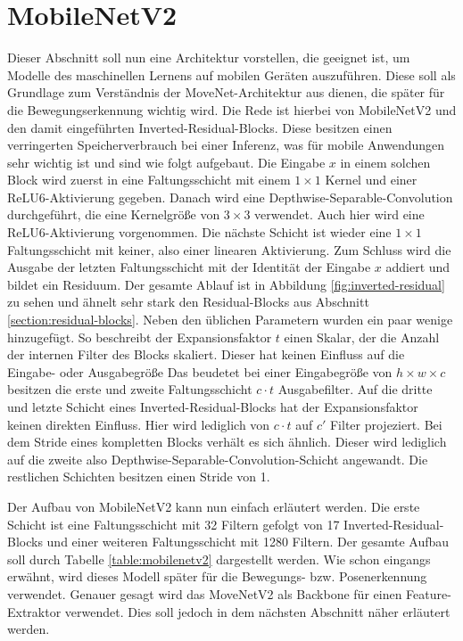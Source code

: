 \section{MobileNetV2}
Dieser Abschnitt soll nun eine Architektur vorstellen, die geeignet ist, um
Modelle des maschinellen Lernens auf mobilen Geräten auszuführen. Diese soll als
Grundlage zum Verständnis der MoveNet-Architektur aus \cite{movenet} dienen, die
später für die Bewegungserkennung wichtig wird. Die Rede ist hierbei von
MobileNetV2 \cite{sandler2019mobilenetv2} und den damit eingeführten
Inverted-Residual-Blocks. Diese besitzen einen verringerten Speicherverbrauch
bei einer Inferenz, was für mobile Anwendungen sehr wichtig ist und sind wie
folgt aufgebaut. Die Eingabe $x$ in einem solchen Block wird zuerst in eine
Faltungsschicht mit einem $1 \times 1$ Kernel und einer ReLU6-Aktivierung
gegeben. Danach wird eine Depthwise-Separable-Convolution
\cite{howard2017mobilenets} durchgeführt, die eine Kernelgröße von $3 \times 3$
verwendet. Auch hier wird eine ReLU6-Aktivierung vorgenommen. Die nächste
Schicht ist wieder eine $1 \times 1$ Faltungsschicht mit keiner, also einer
linearen Aktivierung. Zum Schluss wird die Ausgabe der letzten Faltungsschicht
mit der Identität der Eingabe $x$ addiert und bildet ein Residuum. Der gesamte
Ablauf ist in Abbildung \ref{fig:inverted-residual} zu sehen und ähnelt sehr
stark den Residual-Blocks aus Abschnitt \ref{section:residual-blocks}. Neben den
üblichen Parametern wurden ein paar wenige hinzugefügt. So beschreibt der
Expansionsfaktor $t$ einen Skalar, der die Anzahl der internen Filter des Blocks
skaliert. Dieser hat keinen Einfluss auf die Eingabe- oder Ausgabegröße Das
beudetet bei einer Eingabegröße von $h \times w \times c$ besitzen
die erste und zweite Faltungsschicht $c \cdot t$ Ausgabefilter. Auf die dritte und
letzte Schicht eines Inverted-Residual-Blocks hat der Expansionsfaktor keinen
direkten Einfluss. Hier wird lediglich von $c \cdot t$ auf $c'$ Filter projeziert.
Bei dem Stride eines kompletten Blocks verhält es sich ähnlich. Dieser wird lediglich
auf die zweite also Depthwise-Separable-Convolution-Schicht angewandt. Die restlichen
Schichten besitzen einen Stride von 1.

Der Aufbau von MobileNetV2 kann nun einfach erläutert werden. Die erste Schicht
ist eine Faltungsschicht mit 32 Filtern gefolgt von 17 Inverted-Residual-Blocks
und einer weiteren Faltungsschicht mit 1280 Filtern. Der gesamte Aufbau soll
durch Tabelle \ref{table:mobilenetv2} dargestellt werden. Wie schon eingangs erwähnt,
wird dieses Modell später für die Bewegungs- bzw. Posenerkennung verwendet. Genauer gesagt
wird das MoveNetV2 als Backbone für einen Feature-Extraktor verwendet. Dies soll jedoch
in dem nächsten Abschnitt näher erläutert werden.

